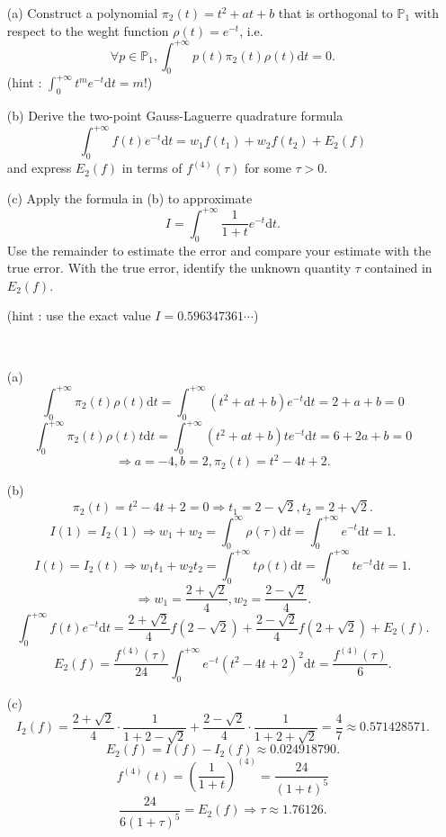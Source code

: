 \documentclass[lang=cn,a4paper,newtx,bibend=bibtex]{elegantpaper}
\newcommand{\dd}{\mathrm{d}}
\newcommand{\Int}[4]{\int_{#1}^{#2}{#3}{\dd {#4}}}
\begin{document}
\begin{prob}
\begin{enumerate}
  \item[(a)] Construct a polynomial $\pi_2(t) = t^2 + at + b$ that is orthogonal to $\mathbb{P}_1$
  with respect to the weght function $\rho(t) = e^{-t}$, i.e.
  \[\forall p \in \mathbb{P}_1, \Int{0}{+\infty}{p(t)\pi_2(t)\rho(t)}{t} = 0.\]
  (hint : $\Int{0}{+\infty}{t^me^{-t}}{t} = m!$)
  \item [(b)] Derive the two-point Gauss-Laguerre quadrature formula
  \[\Int{0}{+\infty}{f(t)e^{-t}}{t} = w_1f(t_1) + w_2f(t_2) + E_2(f)\]
  and express $E_2(f)$ in terms of $f^{(4)}(\tau)$ for some $\tau > 0$.
  \item[(c)] Apply the formula in (b) to approximate
  \[I = \Int{0}{+\infty}{\frac1{1+t}e^{-t}}{t}.\]
  Use the remainder to estimate the error and compare your estimate with the true error.
  With the true error, identify the unknown quantity $\tau$ contained in $E_2(f)$.

  (hint : use the exact value $I = 0.596347361\cdots$)
\end{enumerate}
\end{prob}

\begin{solution}~~

  \begin{enumerate}
    \item[(a)]
    \[\Int{0}{+\infty}{\pi_2(t)\rho(t)}{t} = \Int{0}{+\infty}{(t^2+at+b)e^{-t}}{t} = 2+a+b = 0\]
    \[\Int{0}{+\infty}{\pi_2(t)\rho(t)t}{t} =\Int{0}{+\infty}{(t^2+at+b)te^{-t}}{t} = 6+2a+b = 0\]
    \[\Rightarrow a = -4, b = 2, \pi_2(t) = t^2 - 4t + 2.\]
    \item[(b)]
    \[\pi_2(t) = t^2 - 4t + 2 = 0 \Rightarrow t_1 = 2-\sqrt{2}, t_2 = 2+\sqrt{2}.\]
    \[I(1) = I_2(1) \Rightarrow w_1 + w_2 = \Int{0}{\infty}{\rho(\tau)}{t} = \Int{0}{+\infty}{e^{-t}}{t} = 1.\]
    \[I(t) = I_2(t) \Rightarrow w_1t_1 + w_2t_2 = \Int{0}{+\infty}{t\rho(t)}{t} = \Int{0}{+\infty}{te^{-t}}{t} = 1.\]
    \[\Rightarrow w_1 = \dfrac{2+\sqrt{2}}{4}, w_2 = \dfrac{2-\sqrt{2}}{4}.\]
    \[\Int{0}{+\infty}{f(t)e^{-t}}{t} = \dfrac{2+\sqrt{2}}{4}f(2-\sqrt{2}) + \dfrac{2-\sqrt{2}}{4}f(2+\sqrt{2})+E_2(f).\]
    \[E_2(f) = \dfrac{f^{(4)}(\tau)}{24} \Int{0}{+\infty}{e^{-t}(t^2-4t+2)^2}{t} =\dfrac{f^{(4)}(\tau)}{6}.\]
    \item[(c)] 
    \[I_2(f) = \dfrac{2+\sqrt{2}}{4} \cdot \dfrac{1}{1+2-\sqrt{2}} + \dfrac{2 - \sqrt{2}}{4} \cdot\dfrac{1}{1+2+\sqrt{2}} = \dfrac{4}7 \approx 0.571428571.\]
    \[E_2(f) = I(f) - I_2(f) \approx 0.024918790.\]
    \[f^{(4)}(t) = \left(\dfrac{1}{1+t}\right)^{(4)} = \dfrac{24}{(1+t)^5}\]
    \[\dfrac{24}{6(1+\tau)^5} = E_2(f) \Rightarrow \tau \approx 1.76126.\]
  \end{enumerate}
\end{solution}
\end{document}
